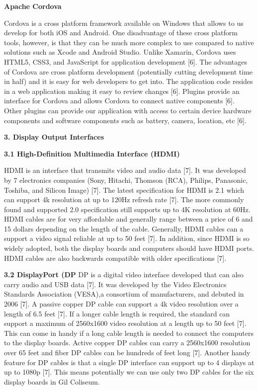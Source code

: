\documentclass[letterpaper,10pt,draftclsnofoot,onecolumn,]{IEEEtran}
\begin{document}
\textbf{Apache Cordova}
\par Cordova is a cross platform framework available on Windows that allows to us develop for both iOS and Android. One disadvantage of these cross platform tools, however, is that they can be much more complex to use compared to native solutions such as Xcode and Android Studio. Unlike Xamarin, Cordova uses HTML5, CSS3, and JavaScript for application development [6]. The advantages of Cordova are cross platform development (potentially cutting development time in half) and it is easy for web developers to get into. The application code resides in a web application making it easy to review changes [6]. Plugins provide an interface for Cordova and allows Cordova to connect native components [6]. Other plugins can provide our application with access to certain device hardware components and software components such as battery, camera, location, etc [6].  

\begin{center}
\textbf{3. Display Output Interfaces}\\
\end{center}

\textbf{3.1 High-Definition Multimedia Interface (HDMI)}
\par HDMI is an interface that transmits video and audio data [7]. It was developed by 7 electronics companies (Sony, Hitachi, Thomson (RCA), Philips, Panasonic, Toshiba, and Silicon Image) [7]. The latest specification for HDMI is 2.1 which can support 4k resolution at up to 120Hz refresh rate [7]. The more commonly found and supported 2.0 specification still supports up to 4K resolution at 60Hz. HDMI cables are for very affordable and generally range between a price of 6 and 15 dollars depending on the length of the cable. Generally, HDMI cables can a support a video signal reliable at up to 50 feet [7]. In addition, since HDMI is so widely adopted, both the display boards and computers should have HDMI ports. HDMI cables are also backwards compatible with older specifications [7]. 
\par

\textbf{3.2 DisplayPort (DP}
DP is a digital video interface developed that can also carry audio and USB data [7]. It was developed by the Video Electronics Standards Association (VESA),a consortium of manufacturers, and debuted in 2006 [7]. A passive copper DP cable can support a 4k video resolution over a length of 6.5 feet [7]. If a longer cable length is required, the standard can support a maximum of 2560x1600 video resolution at a length up to 50 feet [7]. This can come in handy if a long cable length is needed to connect the computers to the display boards. Active copper DP cables can carry a 2560x1600 resolution over 65 feet and fiber DP cables can be hundreds of feet long [7]. Another handy feature for DP cables is that a single DP interface can support up to 4 displays at up to 1080p [7]. This means potentially we can use only two DP cables for the six display boards in Gil Coliseum.
\par
\end{document}

